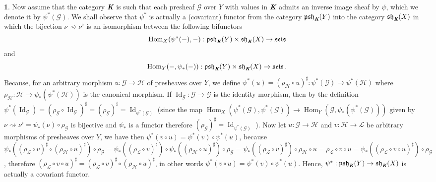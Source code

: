 \documentclass[12pt]{amsart}
\newcommand{\Hom}{\operatorname{Hom}}
\newcommand{\Id}{\operatorname{Id}}
\newcommand{\sets}{\operatorname{\mathfrak{sets}}}
\newcommand{\psh}{\operatorname{\mathfrak{psh}}}
\newcommand{\sh}{\operatorname{\mathfrak{sh}}}
\theoremstyle{definition}
\newtheorem{bk}[proposition]{}
\begin{document}
\begin{bk}\label{I: 3.5.4} Now assume that the category $\emph{\textbf{K}}$ is such that each presheaf $\mathscr{G}$ over $Y$ with values in $\emph{\textbf{K}}$ admits an inverse image sheaf by $\psi$, which we denote it by $\psi^{\ast}(\mathscr{G})$. We shall observe that $\psi^{\ast}$ is actually a (covariant) functor from the category $\psh_{\emph{\textbf{K}}}(Y)$ into the category  $\sh_{\emph{\textbf{K}}}(X)$ in which the bijection $\nu\rightsquigarrow\nu^{\flat}$ is an isomorphism between the following bifunctors $$\Hom_{X}(\psi^{\ast}(-),-):
\psh_{\emph{\textbf{K}}}(Y)\times\sh_{\emph{\textbf{K}}}(X)
\rightarrow\sets$$ and $$\Hom_{Y}(-,\psi_{\ast}(-)):
\psh_{\emph{\textbf{K}}}(Y)\times\sh_{\emph{\textbf{K}}}(X)
\rightarrow\sets .$$ Because, for an arbitrary morphism $u:\mathscr{G}\rightarrow\mathscr{H}$ of presheaves over $Y$, we define $\psi^{\ast}(u)=(\rho_{\mathcal{\mathcal{H}}}\circ u)^{\sharp}:\psi^{\ast}(\mathscr{G})\rightarrow\psi^{\ast}(\mathscr{H})$ where $\rho_{\mathcal{H}}:\mathscr{H}\rightarrow
\psi_{\ast}(\psi^{\ast}(\mathscr{H}))$ is the canonical morphism. If $\Id_{\mathscr{G}}:\mathscr{G}\rightarrow\mathscr{G}$ is the identity morphism, then by the definition $\psi^{\ast}(\Id_{\mathscr{G}})=
(\rho_{\mathcal{G}}\circ\Id_{\mathscr{G}})^{\sharp}=
(\rho_{\mathcal{G}})^{\sharp}=\Id_{\psi^{\ast}(\mathscr{G})}$ (since the map $\Hom_{X}(\psi^{\ast}(\mathscr{G}),\psi^{\ast}(\mathscr{G}))
\rightarrow\Hom_{Y}(\mathscr{G},\psi_{\ast}(\psi^{\ast}(\mathscr{G})))$ given by $\nu\rightsquigarrow\nu^{\flat}=\psi_{\ast}(\nu)\circ\rho_{\mathcal{G}}$ is bijective and $\psi_{\ast}$ is a functor therefore $(\rho_{\mathcal{G}})^{\sharp}=\Id_{\psi^{\ast}(\mathscr{G})}$ ). Now let $u:\mathscr{G}\rightarrow\mathscr{H}$ and $v:\mathscr{H}\rightarrow\mathscr{L}$ be arbitrary morphisms of presheaves over $Y$, we have then $\psi^{\ast}(v\circ u)=\psi^{\ast}(v)\circ\psi^{\ast}(u)$,
because $\psi_{\ast}((\rho_{\mathcal{L}}\circ v)^{\sharp}\circ(\rho_{\mathcal{H}}\circ u)^{\sharp})\circ\rho_{\mathcal{G}}=
\psi_{\ast}((\rho_{\mathcal{L}}\circ v)^{\sharp})\circ\psi_{\ast}((\rho_{\mathcal{H}}\circ u)^{\sharp})\circ\rho_{\mathcal{G}}=\psi_{\ast}((\rho_{\mathcal{L}}\circ v)^{\sharp})\circ\rho_{\mathcal{H}}\circ u=\rho_{\mathcal{L}}\circ v\circ u=\psi_{\ast}((\rho_{\mathcal{L}}\circ v\circ u)^{\sharp})\circ\rho_{\mathcal{G}}$, therefore $(\rho_{\mathcal{L}}\circ v\circ u)^{\sharp}=(\rho_{\mathcal{L}}\circ v)^{\sharp}\circ(\rho_{\mathcal{H}}\circ u)^{\sharp}$, in other words $\psi^{\ast}(v\circ u)=\psi^{\ast}(v)\circ\psi^{\ast}(u)$. Hence, $\psi^{\ast}:\psh_{\emph{\textbf{K}}}(Y)
\rightarrow\sh_{\emph{\textbf{K}}}(X)$ is actually a covariant functor.


\end{bk}
\end{document}
